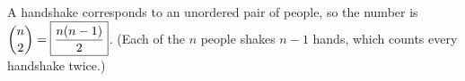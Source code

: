 A handshake corresponds to an unordered pair of people, so the number is $\dbinom n2=\boxed{\dfrac{n(n-1)}{2}}$. (Each of the $n$ people shakes $n-1$ hands, which counts every handshake twice.)
